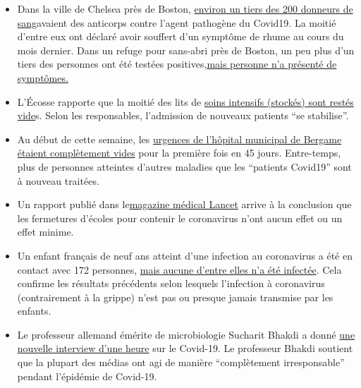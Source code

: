 \begin{itemize}
\item
  Dans la ville de Chelsea près de Boston,
  \href{https://archive.is/20200418222442/https://www.bostonglobe.com/2020/04/17/business/nearly-third-200-blood-samples-taken-chelsea-show-exposure-coronavirus/}{environ
  un tiers des 200 donneurs de sang}avaient des anticorps contre l'agent
  pathogène du Covid19. La moitié d'entre eux ont déclaré avoir souffert
  d'un symptôme de rhume au cours du mois dernier. Dans un refuge pour
  sans-abri près de Boston, un peu plus d'un tiers des personnes ont été
  testées
  positives,\href{https://www.wsbtv.com/news/trending/coronavirus-cdc-reviewing-stunning-universal-testing-results-boston-homeless-shelter/ZADQ45HCAZEVJAZA3OTCUR7M6M/}{mais
  personne n'a présenté de symptômes.}
\item
  L'Écosse rapporte que la moitié des lits de
  \href{https://www.heraldscotland.com/news/18377095.coronavirus-scotland-half-icu-beds-empty/}{soins
  intensifs (stockés) sont restés vide}s. Selon les responsables,
  l'admission de nouveaux patients ``se stabilise''.
\item
  Au début de cette semaine, les
  \href{https://orf.at/stories/3162642/}{urgences de l'hôpital municipal
  de Bergame étaient complètement vides} pour la première fois en 45
  jours. Entre-temps, plus de personnes atteintes d'autres maladies que
  les ``patients Covid19'' sont à nouveau traitées.
\item
  Un rapport publié dans
  le\href{https://www.thelancet.com/journals/lanchi/article/PIIS2352-4642(20)30095-X/fulltext}{magazine
  médical Lancet} arrive à la conclusion que les fermetures d'écoles
  pour contenir le coronavirus n'ont aucun effet ou un effet minime.
\item
  Un enfant français de neuf ans atteint d'une infection au coronavirus
  a été en contact avec 172 personnes,
  \href{https://www.n-tv.de/panorama/172-Kontaktpersonen-von-Corona-verschont-article21727469.html}{mais
  aucune d'entre elles n'a été infectée}. Cela confirme les résultats
  précédents selon lesquels l'infection à coronavirus (contrairement à
  la grippe) n'est pas ou presque jamais transmise par les enfants.
\item
  Le professeur allemand émérite de microbiologie Sucharit Bhakdi a
  donné
  \href{https://kenfm.de/kenfm-am-set-gespraech-mit-prof-dr-sucharit-bhakdi-zu-covid-19/}{une
  nouvelle interview d'une heure} sur le Covid-19. Le professeur Bhakdi
  soutient que la plupart des médias ont agi de manière ``complètement
  irresponsable'' pendant l'épidémie de Covid-19.

\end{itemize}
